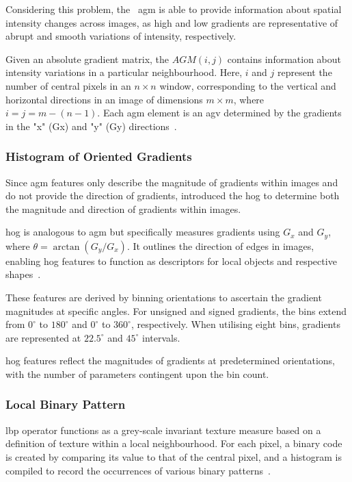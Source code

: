 Considering this problem, the ~\acf{agm} is able to provide information about spatial intensity changes across images, as high and low gradients are representative of abrupt and smooth variations of intensity, respectively.

Given an absolute gradient matrix, the $AGM(i,j)$ contains information about intensity variations in a particular neighbourhood. Here, $i$ and $j$ represent the number of central pixels in an $n \times n$ window, corresponding to the vertical and horizontal directions in an image of dimensions $m \times m$, where $i = j = m - (n - 1)$. Each \ac{agm} element is an \ac{agv} determined by the gradients in the "x" (Gx) and "y" (Gy) directions~\cite{abbasian_ardakani_interpretation_2022}.

\subsubsection{Histogram of Oriented Gradients}

Since \ac{agm} features only describe the magnitude of gradients within images and do not provide the direction of gradients, \textcite{dalal_histograms_2005} introduced the \acf{hog} to determine both the magnitude and direction of gradients within images.

\ac{hog} is analogous to \ac{agm} but specifically measures gradients using $G_x$ and $G_y$, where $\theta = \arctan(G_y/G_x)$. It outlines the direction of edges in images, enabling \ac{hog} features to function as descriptors for local objects and respective shapes~\cite{abbasian_ardakani_interpretation_2022}.

These features are derived by binning orientations to ascertain the gradient magnitudes at specific angles. For unsigned and signed gradients, the bins extend from $0^\circ$ to $180^\circ$ and $0^\circ$ to $360^\circ$, respectively. When utilising eight bins, gradients are represented at $22.5^\circ$ and $45^\circ$ intervals.

\ac{hog} features reflect the magnitudes of gradients at predetermined orientations, with the number of parameters contingent upon the bin count.


\subsubsection{Local Binary Pattern}

\acf{lbp} operator functions as a grey-scale invariant texture measure based on a definition of texture within a local neighbourhood. For each pixel, a binary code is created by comparing its value to that of the central pixel, and a histogram is compiled to record the occurrences of various binary patterns~\cite{pietikainen_image_2005, abbasian_ardakani_interpretation_2022}.



